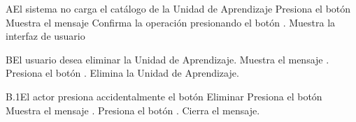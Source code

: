 
\begin{comment}
\begin{UCtrayectoriaA}{A}{El sistema no encuentra ningún formulario para mostrar.}
	\UCpaso No encuentra ningún formulario para mostrar.
    \UCpaso El sistema muestra el mensaje \MSGref{MSG6}{Por el momento no se puede registrar la bibliografía}.
    \UCpaso[\UCactor] Cierra el mensaje presionando el botón \IUbutton{Aceptar}.
    \UCpaso Continua en el paso 1 de la trayectoria principal del \UCref{CU1}.
\end{UCtrayectoriaA}
\end{comment}


\begin{UCtrayectoriaA}{A}{El sistema no carga el catálogo de la Unidad de Aprendizaje}
	\UCpaso[\UCactor] Presiona el botón 
	\UCpaso Muestra el mensaje 
	\UCpaso[\UCactor] Confirma la operación presionando el botón .
	 \UCpaso Muestra la interfaz de usuario 

\end{UCtrayectoriaA}





\begin{UCtrayectoriaA}{B}{El usuario desea eliminar la Unidad de Aprendizaje.}
	\UCpaso  Muestra el mensaje .
	\UCpaso[\UCactor] Presiona el botón .
	\UCpaso Elimina la Unidad de Aprendizaje.
\end{UCtrayectoriaA}



\begin{UCtrayectoriaA}{B.1}{El actor presiona accidentalmente el botón Eliminar}
	\UCpaso[\UCactor] Presiona el botón 
	\UCpaso Muestra el mensaje .
	\UCpaso[\UCactor] Presiona el botón .
	\UCpaso Cierra el mensaje.

\end{UCtrayectoriaA}

